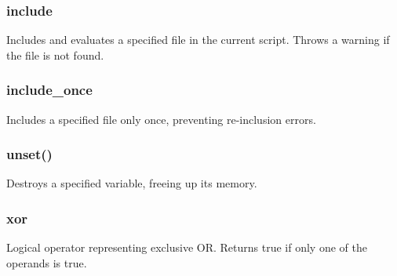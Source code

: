 \documentclass{report}
\begin{document}
\bigbreak \noindent 
\subsubsection{include}
\bigbreak \noindent 
Includes and evaluates a specified file in the current script. Throws a warning if the file is not found.

\bigbreak \noindent 
\subsubsection{include\_once}
\bigbreak \noindent 
Includes a specified file only once, preventing re-inclusion errors.

\bigbreak \noindent 
\subsubsection{unset()}
\bigbreak \noindent 
Destroys a specified variable, freeing up its memory.

\bigbreak \noindent 
\subsubsection{xor}
\bigbreak \noindent 
Logical operator representing exclusive OR. Returns true if only one of the operands is true.
\end{document}
